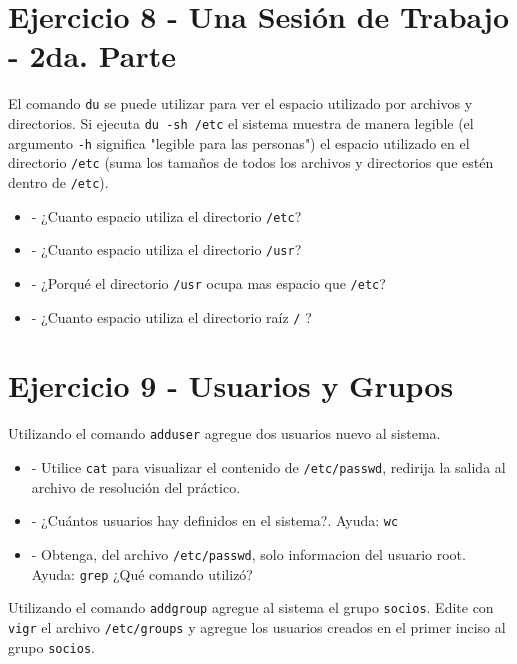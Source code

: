 \documentclass[12pt]{article}
\begin{document}
\section*{Ejercicio 8 - Una Sesión de Trabajo - 2da. Parte}
El comando \texttt{du} se puede utilizar para ver el espacio utilizado por archivos y directorios.
Si ejecuta \texttt{du -sh /etc} el sistema muestra de manera legible (el argumento \texttt{-h} significa "legible para las personas")
el espacio utilizado en el directorio \texttt{/etc} (suma los tamaños de todos los archivos y directorios que estén dentro de \texttt{/etc}).

\begin{itemize}
\item - ¿Cuanto espacio utiliza el directorio \texttt{/etc}?
\item - ¿Cuanto espacio utiliza el directorio \texttt{/usr}?
\item - ¿Porqué el directorio \texttt{/usr} ocupa mas espacio que \texttt{/etc}?
\item - ¿Cuanto espacio utiliza el directorio raíz \texttt{/} ?
\end{itemize}



\section*{Ejercicio 9 - Usuarios y Grupos}

Utilizando el comando \texttt{adduser} agregue dos usuarios nuevo al sistema.

\begin{itemize}
\item - Utilice \texttt{cat} para visualizar el contenido de \texttt{/etc/passwd}, redirija la salida al archivo de resolución del práctico.
\item - ¿Cuántos usuarios hay definidos en el sistema?. Ayuda: \texttt{wc}
\item - Obtenga, del archivo \texttt{/etc/passwd}, solo informacion del usuario root. Ayuda: \texttt{grep} ¿Qué comando utilizó?
\end{itemize}

Utilizando el comando \texttt{addgroup} agregue al sistema el grupo \texttt{socios}.
Edite con \texttt{vigr} el archivo \texttt{/etc/groups} y agregue los usuarios creados en el primer inciso al grupo \texttt{socios}.
\end{document}
